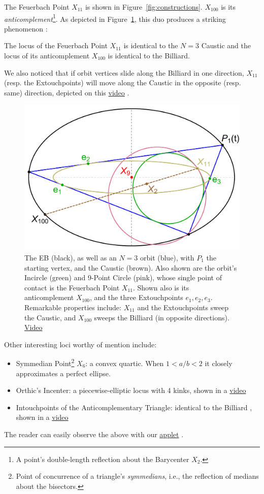 The Feuerbach Point $X_{11}$  is shown in Figure~\ref{fig:constructions}. $X_{100}$ is its {\em anticomplement}\footnote{A point's double-length reflection about the Barycenter $X_2$.}. As depicted in Figure~\ref{fig:feuer_loci}, 
this duo produces 
a striking phenomenon \cite{ronaldo19a}:

\begin{theorem}
The locus of the Feuerbach Point $X_{11}$ is identical to the $N=3$ Caustic and the locus of its anticomplement $X_{100}$ is identical to the Billiard.
\end{theorem}

We also noticed that if orbit vertices slide along the Billiard in one direction, $X_{11}$ (resp. the Extouchpoints) will move along the Caustic in the opposite (resp. same) direction, depicted on this \href{https://youtu.be/TXdg7tUl8lc}{video} \cite[pl\#10]{dsr_math_intell_playlist}.

\begin{figure}[H]
    \centering
    \includegraphics[width=.60\textwidth]{pics/u0035_feuerbach_loci.pdf}
    \caption{The EB (black), as well as an $N=3$ orbit (blue), with $P_1$ the starting vertex, and the Caustic (brown). Also shown are the orbit's Incircle (green) and 9-Point Circle (pink), whose single point of contact is the Feuerbach Point $X_{11}$. Shown also is its anticomplement $X_{100}$, and the three Extouchpoints $e_1,e_2,e_3$. Remarkable properties include: $X_{11}$ and the Extouchpoints sweep the Caustic, and $X_{100}$ sweeps the Billiard (in opposite directions).
    \href{https://youtu.be/TXdg7tUl8lc}{Video} \cite[pl\#12]{dsr_math_intell_playlist}}
    \label{fig:feuer_loci}
\end{figure}

\noindent Other interesting loci worthy of mention include:

\begin{itemize}
    \item Symmedian Point\footnote{Point of concurrence of a triangle's {\em symmedians}, i.e., the reflection of medians about the bisectors.} $X_6$: a convex quartic. When $1<a/b<2$ it closely approximates a perfect ellipse.
    \item Orthic's Incenter: a piecewise-elliptic locus with 4 kinks, shown in a  \href{https://youtu.be/3qJnwpFkUFQ}{video} \cite[pl\#11]{dsr_math_intell_playlist}
    \item Intouchpoints of the Anticomplementary Triangle: identical to the Billiard \cite{minevich17}, shown in a \href{https://youtu.be/50dyxWJhfN4}{video} \cite[pl\#12]{dsr_math_intell_playlist} 
\end{itemize}

\noindent The reader can easily observe the above with our \href{https://editor.p5js.org/undefined/present/i1Lin7lt7}{applet} \cite{dsr_applet_x12345}. 